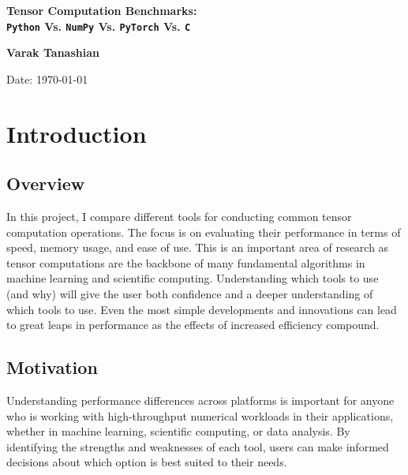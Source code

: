 \documentclass[a4paper,12pt]{article}
\begin{document}

\begin{titlepage}
    \centering
    \vspace*{3cm}
    {\Huge\bfseries Tensor Computation Benchmarks: \\ \texttt{Python} Vs. \texttt{NumPy} Vs. \texttt{PyTorch} Vs. \texttt{C} \par}
    \vspace{2cm}
    {\Large\textbf{Varak Tanashian} \par}
    \vspace{1.5cm}
    {\large Date: \today \par}
    \vfill
\end{titlepage}

\setcounter{page}{1}


\tableofcontents


\section{Introduction}
\subsection{Overview}

In this project, I compare different tools for conducting common tensor computation operations. The focus is on evaluating their performance in terms of speed, memory usage, and ease of use. This is an important area of research as tensor computations are the backbone of many fundamental algorithms in machine learning and scientific computing. Understanding which tools to use (and why) will give the user both confidence and a deeper understanding of which tools to use. Even the most simple developments and innovations can lead to great leaps in performance as the effects of increased efficiency compound.

\subsection{Motivation}

Understanding performance differences across platforms is important for anyone who is working with high-throughput numerical workloads in their applications, whether in machine learning, scientific computing, or data analysis. By identifying the strengths and weaknesses of each tool, users can make informed decisions about which option is best suited to their needs. 
\end{document}

